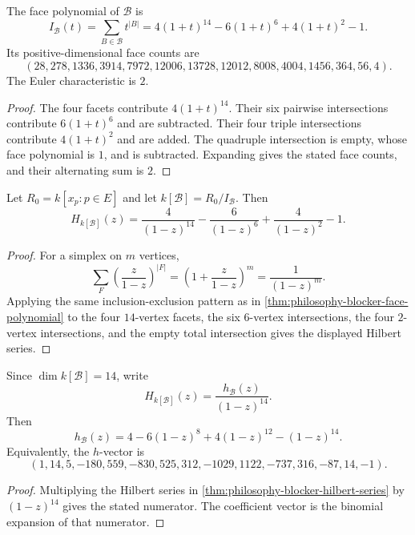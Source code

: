 \begin{theorem}
\label{thm:philosophy-blocker-face-polynomial}
The face polynomial of $\mathcal{B}$ is
$$
  I_{\mathcal{B}}(t)
  =
  \sum_{B\in\mathcal{B}}t^{|B|}
  =
  4(1+t)^{14}-6(1+t)^{6}+4(1+t)^{2}-1.
$$
Its positive-dimensional face counts are
$$
  (28,278,1336,3914,7972,12006,13728,
  12012,8008,4004,1456,364,56,4).
$$
The Euler characteristic is $2$.
\end{theorem}
\begin{proof}
The four facets contribute $4(1+t)^{14}$. Their six pairwise
intersections contribute $6(1+t)^{6}$ and are subtracted. Their four
triple intersections contribute $4(1+t)^{2}$ and are added. The
quadruple intersection is empty, whose face polynomial is $1$, and is
subtracted. Expanding gives the stated face counts, and their
alternating sum is $2$.
\end{proof}

\begin{theorem}
\label{thm:philosophy-blocker-hilbert-series}
Let $R_{0}=k[x_{p}:p\in E]$ and let $k[\mathcal{B}]=R_{0}/I_{\mathcal{B}}$.
Then
$$
  H_{k[\mathcal{B}]}(z)
  =
  \frac{4}{(1-z)^{14}}
  -
  \frac{6}{(1-z)^{6}}
  +
  \frac{4}{(1-z)^{2}}
  -
  1.
$$
\end{theorem}
\begin{proof}
For a simplex on $m$ vertices,
$$
  \sum_{F}
  \left(\frac{z}{1-z}\right)^{|F|}
  =
  \left(1+\frac{z}{1-z}\right)^{m}
  =
  \frac{1}{(1-z)^{m}}.
$$
Applying the same inclusion-exclusion pattern as in
\autoref{thm:philosophy-blocker-face-polynomial} to the four
$14$-vertex facets, the six $6$-vertex intersections, the four
$2$-vertex intersections, and the empty total intersection gives the
displayed Hilbert series.
\end{proof}

\begin{theorem}[$h$-polynomial]
\label{thm:philosophy-blocker-h-polynomial}
Since $\dim k[\mathcal{B}]=14$, write
$$
  H_{k[\mathcal{B}]}(z)=\frac{h_{\mathcal{B}}(z)}{(1-z)^{14}}.
$$
Then
$$
  h_{\mathcal{B}}(z)
  =
  4-6(1-z)^{8}+4(1-z)^{12}-(1-z)^{14}.
$$
Equivalently, the $h$-vector is
$$
  (1,14,5,-180,559,-830,525,312,
  -1029,1122,-737,316,-87,14,-1).
$$
\end{theorem}
\begin{proof}
Multiplying the Hilbert series in
\autoref{thm:philosophy-blocker-hilbert-series} by $(1-z)^{14}$ gives
the stated numerator. The coefficient vector is the binomial expansion
of that numerator.
\end{proof}

